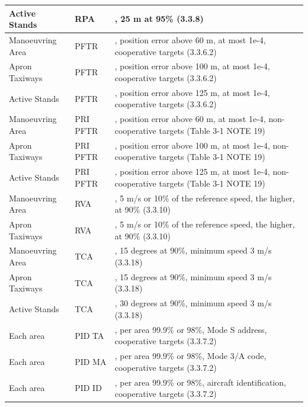 \begin{center}
\begin{table}[H]
\begin{tabularx}{\textwidth}{ | l | l | X | }
    Active Stands & RPA & \nameref{sec:eval_req_pos_distance}, 25 m at 95\% (3.3.8) \\ \hline
    Manoeuvring Area & PFTR & \nameref{sec:eval_req_pos_distance}, position error above 60 m, at most 1e-4, cooperative targets (3.3.6.2) \\ \hline
    Apron Taxiways & PFTR & \nameref{sec:eval_req_pos_distance}, position error above 100 m, at most 1e-4, cooperative targets (3.3.6.2) \\ \hline
    Active Stands & PFTR & \nameref{sec:eval_req_pos_distance}, position error above 125 m, at most 1e-4, cooperative targets (3.3.6.2) \\ \hline
    Manoeuvring Area & PRI PFTR & \nameref{sec:eval_req_pos_distance}, position error above 60 m, at most 1e-4, non-cooperative targets (Table 3-1 NOTE 19) \\ \hline
    Apron Taxiways & PRI PFTR & \nameref{sec:eval_req_pos_distance}, position error above 100 m, at most 1e-4, non-cooperative targets (Table 3-1 NOTE 19) \\ \hline
    Active Stands & PRI PFTR & \nameref{sec:eval_req_pos_distance}, position error above 125 m, at most 1e-4, non-cooperative targets (Table 3-1 NOTE 19) \\ \hline
    Manoeuvring Area & RVA & \nameref{sec:eval_req_speed}, 5 m/s or 10\% of the reference speed, the higher, at 90\% (3.3.10) \\ \hline
    Apron Taxiways & RVA & \nameref{sec:eval_req_speed}, 5 m/s or 10\% of the reference speed, the higher, at 90\% (3.3.10) \\ \hline
    Manoeuvring Area & TCA & \nameref{sec:eval_req_track_angle}, 15 degrees at 90\%, minimum speed 3 m/s (3.3.18) \\ \hline
    Apron Taxiways & TCA & \nameref{sec:eval_req_track_angle}, 15 degrees at 90\%, minimum speed 3 m/s (3.3.18) \\ \hline
    Active Stands & TCA & \nameref{sec:eval_req_track_angle}, 30 degrees at 90\%, minimum speed 3 m/s (3.3.18) \\ \hline
    Each area & PID TA & \nameref{sec:eval_req_id_correct}, per area 99.9\% or 98\%, Mode S address, cooperative targets (3.3.7.2) \\ \hline
    Each area & PID MA & \nameref{sec:eval_req_id_correct}, per area 99.9\% or 98\%, Mode 3/A code, cooperative targets (3.3.7.2) \\ \hline
    Each area & PID ID & \nameref{sec:eval_req_id_correct}, per area 99.9\% or 98\%, aircraft identification, cooperative targets (3.3.7.2) \\ \hline

\end{tabularx}
\end{table}
\end{center}

